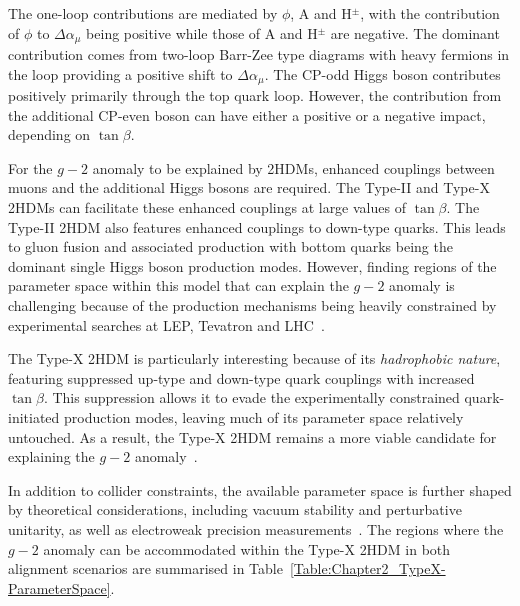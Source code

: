 The one-loop contributions are mediated by $\phi$, A and H$^{\pm}$, with the contribution of $\phi$ to $\Delta\alpha_\mu$ being positive while those of A and H$^{\pm}$ are negative. The dominant contribution comes from two-loop Barr-Zee type diagrams with heavy fermions in the loop providing a positive shift to $\Delta\alpha_\mu$. The CP-odd Higgs boson contributes positively primarily through the top quark loop. However, the contribution from the additional CP-even boson can have either a positive or a negative impact, depending on $\tan{\beta}$. 

For the $g-2$ anomaly to be explained by 2HDMs, enhanced couplings between muons and the additional Higgs bosons are required. The Type-II and Type-X 2HDMs can facilitate these enhanced couplings at large values of $\tan{\beta}$. The Type-II \ac{2HDM} also features enhanced couplings to down-type quarks. This leads to gluon fusion and associated production with bottom quarks being the dominant single Higgs boson production modes. However, finding regions of the parameter space within this model that can explain the $g-2$ anomaly is challenging because of the production mechanisms being heavily constrained by experimental searches at \ac{LEP}, Tevatron and \ac{LHC}~\cite{TypeX_2HDM}.

The Type-X \ac{2HDM} is particularly interesting because of its \textit{hadrophobic nature}, featuring suppressed up-type and down-type quark couplings with increased $\tan{\beta}$. This suppression allows it to evade the experimentally constrained quark-initiated production modes, leaving much of its parameter space relatively untouched. As a result, the Type-X \ac{2HDM} remains a more viable candidate for explaining the $g-2$ anomaly~\cite{TypeX_2HDM}. 

In addition to collider constraints, the available parameter space is further shaped by theoretical considerations, including vacuum stability and perturbative unitarity, as well as electroweak precision measurements~\cite{TypeX_2HDM}. The regions where the $g-2$ anomaly can be accommodated within the Type-X \ac{2HDM} in both alignment scenarios are summarised in Table~\ref{Table:Chapter2_TypeX-ParameterSpace}.

